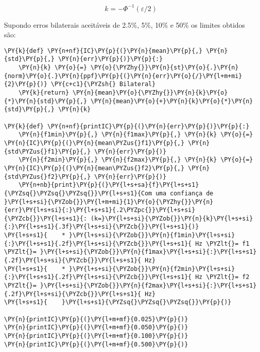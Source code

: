 \begin{equation}
k = -\Phi^{-1}(\varepsilon/2)
\end{equation}

Supondo erros bilaterais aceitáveis de 2.5\%, 5\%, 10\% e 50\% os
limites obtidos são:

    \begin{tcolorbox}[breakable, size=fbox, boxrule=1pt, pad at break*=1mm,colback=cellbackground, colframe=cellborder]
\begin{Verbatim}[commandchars=\\\{\}]
\PY{k}{def} \PY{n+nf}{IC}\PY{p}{(}\PY{n}{mean}\PY{p}{,} \PY{n}{std}\PY{p}{,} \PY{n}{err}\PY{p}{)}\PY{p}{:}
    \PY{n}{k} \PY{o}{=} \PY{o}{\PYZhy{}}\PY{n}{st}\PY{o}{.}\PY{n}{norm}\PY{o}{.}\PY{n}{ppf}\PY{p}{(}\PY{n}{err}\PY{o}{/}\PY{l+m+mi}{2}\PY{p}{)} \PY{c+c1}{\PYZsh{} Bilateral}
    \PY{k}{return} \PY{n}{mean}\PY{o}{\PYZhy{}}\PY{n}{k}\PY{o}{*}\PY{n}{std}\PY{p}{,} \PY{n}{mean}\PY{o}{+}\PY{n}{k}\PY{o}{*}\PY{n}{std}\PY{p}{,} \PY{n}{k}

\PY{k}{def} \PY{n+nf}{printIC}\PY{p}{(}\PY{n}{err}\PY{p}{)}\PY{p}{:}
    \PY{n}{f1min}\PY{p}{,} \PY{n}{f1max}\PY{p}{,} \PY{n}{k} \PY{o}{=} \PY{n}{IC}\PY{p}{(}\PY{n}{mean\PYZus{}f1}\PY{p}{,} \PY{n}{std\PYZus{}f1}\PY{p}{,} \PY{n}{err}\PY{p}{)}
    \PY{n}{f2min}\PY{p}{,} \PY{n}{f2max}\PY{p}{,} \PY{n}{k} \PY{o}{=} \PY{n}{IC}\PY{p}{(}\PY{n}{mean\PYZus{}f2}\PY{p}{,} \PY{n}{std\PYZus{}f2}\PY{p}{,} \PY{n}{err}\PY{p}{)}
    \PY{n+nb}{print}\PY{p}{(}\PY{l+s+sa}{f}\PY{l+s+s1}{\PYZsq{}\PYZsq{}\PYZsq{}}\PY{l+s+s1}{Com uma confiança de }\PY{l+s+si}{\PYZob{}}\PY{l+m+mi}{1}\PY{o}{\PYZhy{}}\PY{n}{err}\PY{l+s+si}{:}\PY{l+s+s1}{.2\PYZpc{}}\PY{l+s+si}{\PYZcb{}}\PY{l+s+s1}{: (k=}\PY{l+s+si}{\PYZob{}}\PY{n}{k}\PY{l+s+si}{:}\PY{l+s+s1}{.3f}\PY{l+s+si}{\PYZcb{}}\PY{l+s+s1}{)}
\PY{l+s+s1}{    * }\PY{l+s+si}{\PYZob{}}\PY{n}{f1min}\PY{l+s+si}{:}\PY{l+s+s1}{.2f}\PY{l+s+si}{\PYZcb{}}\PY{l+s+s1}{ Hz \PYZlt{}= f1 \PYZlt{}= }\PY{l+s+si}{\PYZob{}}\PY{n}{f1max}\PY{l+s+si}{:}\PY{l+s+s1}{.2f}\PY{l+s+si}{\PYZcb{}}\PY{l+s+s1}{ Hz}
\PY{l+s+s1}{    * }\PY{l+s+si}{\PYZob{}}\PY{n}{f2min}\PY{l+s+si}{:}\PY{l+s+s1}{.2f}\PY{l+s+si}{\PYZcb{}}\PY{l+s+s1}{ Hz \PYZlt{}= f2 \PYZlt{}= }\PY{l+s+si}{\PYZob{}}\PY{n}{f2max}\PY{l+s+si}{:}\PY{l+s+s1}{.2f}\PY{l+s+si}{\PYZcb{}}\PY{l+s+s1}{ Hz}
\PY{l+s+s1}{    }\PY{l+s+s1}{\PYZsq{}\PYZsq{}\PYZsq{}}\PY{p}{)}
    
\PY{n}{printIC}\PY{p}{(}\PY{l+m+mf}{0.025}\PY{p}{)}
\PY{n}{printIC}\PY{p}{(}\PY{l+m+mf}{0.050}\PY{p}{)}
\PY{n}{printIC}\PY{p}{(}\PY{l+m+mf}{0.100}\PY{p}{)}
\PY{n}{printIC}\PY{p}{(}\PY{l+m+mf}{0.500}\PY{p}{)}
\end{Verbatim}
\end{tcolorbox}

